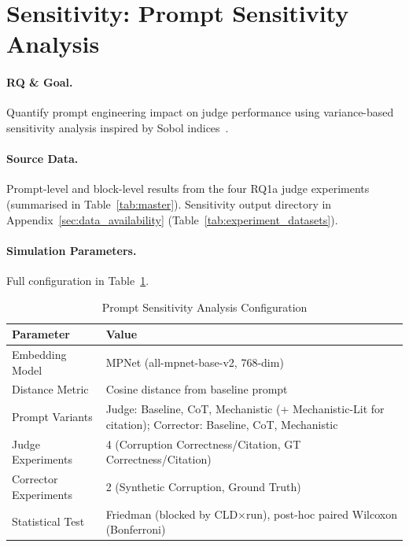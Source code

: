 \section{Sensitivity: Prompt Sensitivity Analysis}
\label{sec:rq1a_sensitivity}

\paragraph{RQ \& Goal.}
Quantify prompt engineering impact on judge performance using variance-based sensitivity analysis inspired by Sobol indices~\cite{sobol1993sensitivity}.

\paragraph{Source Data.}
Prompt-level and block-level results from the four RQ1a judge experiments (summarised in Table~\ref{tab:master}).
Sensitivity output directory in Appendix~\ref{sec:data_availability} (Table~\ref{tab:experiment_datasets}).

\paragraph{Simulation Parameters.}
Full configuration in Table~\ref{tab:prompt_sensitivity_config}.

\begin{table}[H]
\centering
\caption{Prompt Sensitivity Analysis Configuration}
\label{tab:prompt_sensitivity_config}
\footnotesize
\begin{tabular}{@{}ll@{}}
\toprule
\textbf{Parameter} & \textbf{Value} \\
\midrule
Embedding Model & MPNet (all-mpnet-base-v2, 768-dim) \\
Distance Metric & Cosine distance from baseline prompt \\
Prompt Variants & Judge: Baseline, CoT, Mechanistic (+ Mechanistic-Lit for citation); Corrector: Baseline, CoT, Mechanistic \\
Judge Experiments & 4 (Corruption Correctness/Citation, GT Correctness/Citation) \\
Corrector Experiments & 2 (Synthetic Corruption, Ground Truth) \\
Statistical Test & Friedman (blocked by CLD$\times$run), post-hoc paired Wilcoxon (Bonferroni) \\
\bottomrule
\end{tabular}
\end{table}

